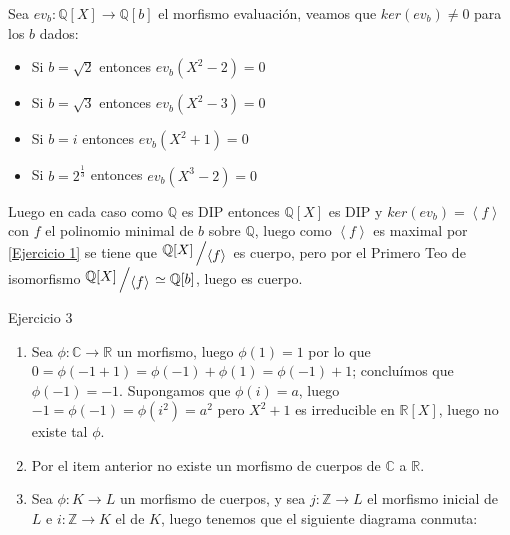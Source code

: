 \documentclass[11pt]{article}
\newcommand{\C}{\mathbb{C}}
\newcommand{\Q}{\mathbb{Q}}
\newcommand{\Z}{\mathbb{Z}}
\newcommand{\R}{{\mathbb{R}}}
\newcommand\ip[1]{\left\langle#1\right\rangle}
\newcommand{\quotient}[2]{{\raisebox{.2em}{$#1$}\left/\raisebox{-.2em}{$#2$}\right.}}
\newenvironment{proof}[1][Demostraci\'on]{\begin{trivlist}
		\item[\hskip \labelsep {\bfseries #1}]}{\end{trivlist}}
\newcommand{\qed}{\nobreak \ifvmode \relax \else
	\ifdim\lastskip<1.5em \hskip-\lastskip
	\hskip1.5em plus0em minus0.5em \fi \nobreak
	\vrule height0.75em width0.5em depth0.25em\fi}
\begin{document}
\begin{enumerate}
	 \label{Ejercicio 2}
	 
	 \begin{proof}
	 	
	 	Sea $ev_{b} : \Q[X] \rightarrow \Q[b]$ el morfismo evaluaci\'on, veamos que $ker(ev_b) \neq 0$ para los $b$ dados:
	 	
	 	\begin{itemize}
	 		
	 		\item Si $b = \sqrt{2}$ entonces $ev_{b}(X^2 -2) = 0$
	 		
	 		\item Si $b = \sqrt{3}$ entonces $ev_{b}(X^2 -3) = 0$
	 		
	 		\item Si $b = i$ entonces $ev_{b}(X^2 +1) = 0$
	 		
	 		\item Si $b = 2^{\frac{1}{{3}}}$ entonces $ev_{b}(X^3 -2) = 0$
	 	\end{itemize}
	 	
	 	Luego en cada caso como $\Q$ es DIP entonces $\Q[X]$ es DIP y $ker(ev_b) = \ip{f}$ con $f$ el polinomio minimal de $b$ sobre $\Q$, luego como $\ip{f}$ es maximal por \ref{Ejercicio 1} se tiene que $\quotient{\Q[X]}{\ip{f}}$ es cuerpo, pero por el Primero Teo de isomorfismo $\quotient{\Q[X]}{\ip{f}} \simeq \Q[b]$, luego es cuerpo. \qed
	 	
	 \end{proof}
	
	\item Ejercicio 3
	
	\label{Ejercicio 3}
	
	\begin{proof}
		
		\begin{enumerate}
			
			\item  Sea $\phi : \C \rightarrow \R$ un morfismo, luego $\phi(1) = 1$ por lo que $0 = \phi(-1 + 1) = \phi(-1) + \phi(1) = \phi(-1) +1$; conclu\'imos que $\phi(-1) = -1$. Supongamos que $\phi(i) = a$, luego $-1 = \phi(-1) = \phi(i^2)=a^2$ pero $X^2 +1$ es irreducible en $\R[X]$, luego no existe tal $\phi$.
			
			\item Por el item anterior no existe un morfismo de cuerpos de $\C$ a $\R$.
			
			\item Sea $\phi : K \rightarrow L$ un morfismo de cuerpos, y sea $j : \Z \rightarrow L$ el morfismo inicial de $L$ e $i : \Z \rightarrow K$ el de $K$, luego tenemos que el siguiente diagrama conmuta:
			

\end{enumerate}
\end{proof}
\end{enumerate}
\end{document}
